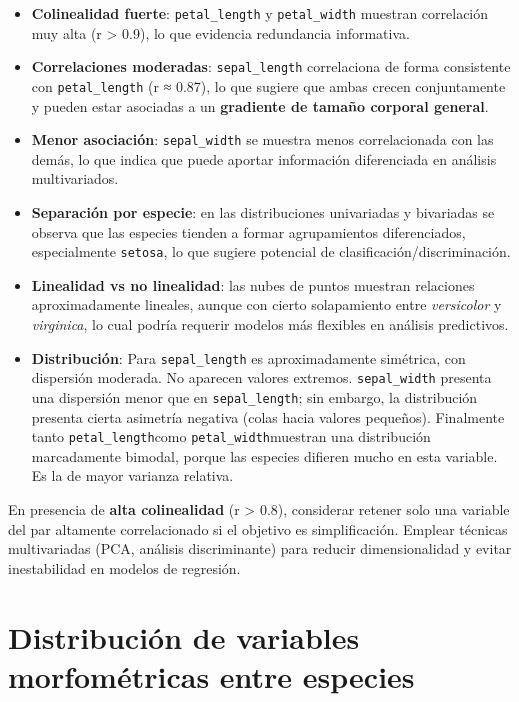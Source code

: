 \documentclass[
  spanish,
  11pt,
  a4paper,
  DIV=11,
  numbers=noendperiod]{scrartcl}
\begin{document}
\begin{itemize}
\item
  \textbf{Colinealidad fuerte}: \texttt{petal\_length} y
  \texttt{petal\_width} muestran correlación muy alta (r \textgreater{}
  0.9), lo que evidencia redundancia informativa.
\item
  \textbf{Correlaciones moderadas}: \texttt{sepal\_length} correlaciona
  de forma consistente con \texttt{petal\_length} (r ≈ 0.87), lo que
  sugiere que ambas crecen conjuntamente y pueden estar asociadas a un
  \textbf{gradiente de tamaño corporal general}.
\item
  \textbf{Menor asociación}: \texttt{sepal\_width} se muestra menos
  correlacionada con las demás, lo que indica que puede aportar
  información diferenciada en análisis multivariados.
\item
  \textbf{Separación por especie}: en las distribuciones univariadas y
  bivariadas se observa que las especies tienden a formar agrupamientos
  diferenciados, especialmente \texttt{setosa}, lo que sugiere potencial
  de clasificación/discriminación.
\item
  \textbf{Linealidad vs no linealidad}: las nubes de puntos muestran
  relaciones aproximadamente lineales, aunque con cierto solapamiento
  entre \emph{versicolor} y \emph{virginica}, lo cual podría requerir
  modelos más flexibles en análisis predictivos.
\item
  \textbf{Distribución}: Para \texttt{sepal\_length} es aproximadamente
  simétrica, con dispersión moderada. No aparecen valores extremos.
  \texttt{sepal\_width} presenta una dispersión menor que en
  \texttt{sepal\_length}; sin embargo, la distribución presenta cierta
  asimetría negativa (colas hacia valores pequeños). Finalmente tanto
  \texttt{petal\_length}como \texttt{petal\_width}muestran una
  distribución marcadamente bimodal, porque las especies difieren mucho
  en esta variable. Es la de mayor varianza relativa.
\end{itemize}

En presencia de \textbf{alta colinealidad} (r \textgreater{} 0.8),
considerar retener solo una variable del par altamente correlacionado si
el objetivo es simplificación. Emplear técnicas multivariadas (PCA,
análisis discriminante) para reducir dimensionalidad y evitar
inestabilidad en modelos de regresión.

\section{Distribución de variables morfométricas entre
especies}\label{distribuciuxf3n-de-variables-morfomuxe9tricas-entre-especies}
\end{document}
